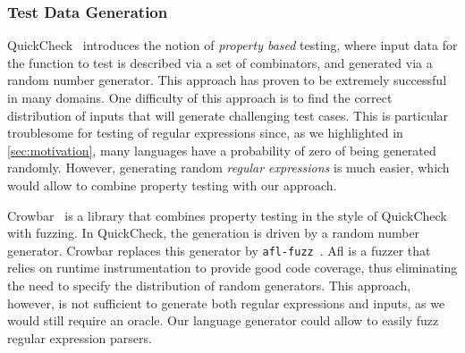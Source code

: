 \subsubsection*{Test Data Generation}

QuickCheck~\cite{DBLP:conf/icfp/ClaessenH00} introduces the notion
of \emph{property based} testing, where input data for the function
to test is described via a set of combinators, and generated via
a random number generator. This approach has proven to be extremely
successful in many domains. One difficulty of this approach is
to find the correct distribution of inputs that will generate challenging
test cases. This is particular troublesome for testing of regular expressions
since, as we highlighted in \cref{sec:motivation}, many languages
have a probability of zero of being generated randomly.
However, generating random \emph{regular expressions} is much easier, which
would allow to combine property testing with our approach.

Crowbar~\cite{crowbar} is a library that combines property testing in
the style of QuickCheck with fuzzing.
In QuickCheck, the generation is driven by a random number generator. Crowbar replaces this generator by \texttt{afl-fuzz}~\cite{afl}. Afl is a fuzzer that
relies on runtime instrumentation to provide
good code coverage, thus eliminating the need to specify the distribution of random generators.
This approach, however, is not sufficient to generate both regular expressions
and inputs, as we would still require an oracle. Our language generator
could allow to easily fuzz regular expression parsers.





